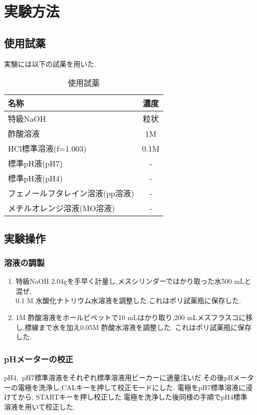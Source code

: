 \section{実験方法}
\subsection{使用試薬}
実験には以下の試薬を用いた.
\begin{table}[h]
   \caption{使用試薬}
   \label{tab:siyaku}
   \centering
   \begin{tabular}{l|c}
     \hline
     名称&濃度\\
     \hline \hline
     特級NaOH&粒状\\
     酢酸溶液&1M\\
     HCl標準溶液(f=1.003)&0.1M\\
     標準pH液(pH7)&-\\
     標準pH液(pH4)&-\\
     フェノールフタレイン溶液(pp溶液)&-\\
     メチルオレンジ溶液(MO溶液)&-\\
     \hline
   \end{tabular}
\end{table}
\subsection{実験操作}
\subsubsection{溶液の調製}
\renewcommand{\theenumi}{\ajLabel\ajMaru{enumi}}
\begin{enumerate}
  \item 特級NaOH 2.04\si{\gram}を手早く計量し,メスシリンダーではかり取った水500 \si{\milli L}と混ぜ,\\
  0.1 M 水酸化ナトリウム水溶液を調整した.これはポリ試薬瓶に保存した.
  \item 1M 酢酸溶液をホールピペットで10 \si{\milli L}はかり取り,200 \si{\milli L}メスフラスコに移し,標線まで水を加え0.05M 酢酸水溶液を調整した.
  これはポリ試薬瓶に保存した.
\end{enumerate}
\subsubsection{pHメーターの校正}
pH4,\ pH7標準溶液をそれぞれ標準溶液用ビーカーに適量注いだ.その後pHメーターの電極を洗浄し,CALキーを押して校正モードにした.
電極をpH7標準溶液に浸けてから, STARTキーを押し校正した.電極を洗浄した後同様の手順でpH4標準溶液を用いて校正した.
